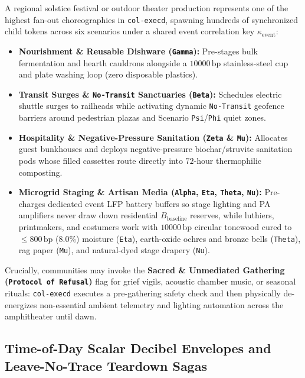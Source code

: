A regional solstice festival or outdoor theater production represents one of the highest fan-out
choreographies in \texttt{col-execd}, spawning hundreds of synchronized child tokens across six scenarios
under a shared event correlation key $\kappa_{\mathrm{event}}$:
\begin{itemize}
    \item \textbf{Nourishment \& Reusable Dishware (\texttt{Gamma}):} Pre-stages bulk fermentation and
    hearth cauldrons alongside a $10000\,\mathrm{bp}$ stainless-steel cup and plate washing loop (zero
    disposable plastics).
    \item \textbf{Transit Surges \& \texttt{No-Transit} Sanctuaries (\texttt{Beta}):} Schedules electric
    shuttle surges to railheads while activating dynamic \texttt{No-Transit} geofence barriers around
    pedestrian plazas and Scenario \texttt{Psi}/\texttt{Phi} quiet zones.
    \item \textbf{Hospitality \& Negative-Pressure Sanitation (\texttt{Zeta} \& \texttt{Mu}):} Allocates
    guest bunkhouses and deploys negative-pressure biochar/struvite sanitation pods whose filled cassettes
    route directly into $72\text{-hour}$ thermophilic composting.
    \item \textbf{Microgrid Staging \& Artisan Media (\texttt{Alpha}, \texttt{Eta}, \texttt{Theta}, \texttt{Nu}):}
    Pre-charges dedicated event LFP battery buffers so stage lighting and PA amplifiers never draw down
    residential $B_{\mathrm{baseline}}$ reserves, while luthiers, printmakers, and costumers work with
    $10000\,\mathrm{bp}$ circular tonewood cured to $\le 800\,\mathrm{bp}$ ($8.0\%$) moisture (\texttt{Eta}),
    earth-oxide ochres and bronze bells (\texttt{Theta}), rag paper (\texttt{Mu}), and natural-dyed stage
    drapery (\texttt{Nu}).
\end{itemize}

Crucially, communities may invoke the \textbf{Sacred \& Unmediated Gathering (\texttt{Protocol of Refusal})}
flag for grief vigils, acoustic chamber music, or seasonal rituals: \texttt{col-execd} executes a
pre-gathering safety check and then physically de-energizes non-essential ambient telemetry and lighting
automation across the amphitheater until dawn.

\subsection{Time-of-Day Scalar Decibel Envelopes and Leave-No-Trace Teardown Sagas}

